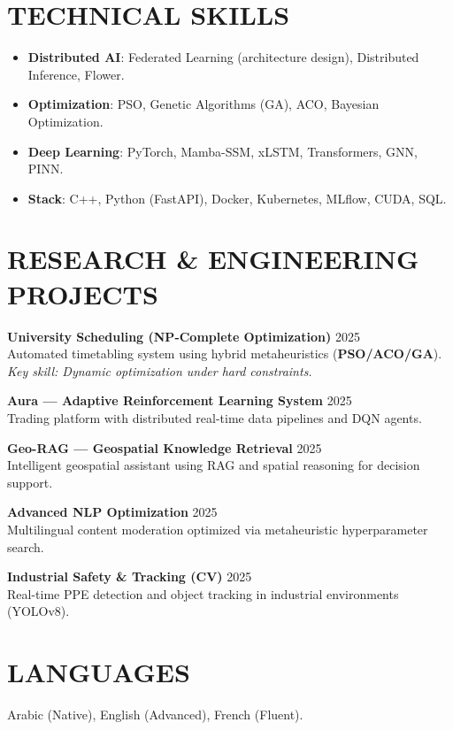 \documentclass[a4paper,11pt]{article}
\begin{document}
\section{TECHNICAL SKILLS}
\begin{itemize}
    \item \textbf{Distributed AI}: Federated Learning (architecture design), Distributed Inference, Flower.
    \item \textbf{Optimization}: PSO, Genetic Algorithms (GA), ACO, Bayesian Optimization.
    \item \textbf{Deep Learning}: PyTorch, Mamba-SSM, xLSTM, Transformers, GNN, PINN.
    \item \textbf{Stack}: C++, Python (FastAPI), Docker, Kubernetes, MLflow, CUDA, SQL.
\end{itemize}

\section{RESEARCH & ENGINEERING PROJECTS}

\textbf{University Scheduling (NP-Complete Optimization)} \hfill 2025 \\
Automated timetabling system using hybrid metaheuristics (\textbf{PSO/ACO/GA}).
\textit{Key skill: Dynamic optimization under hard constraints.}

\textbf{Aura — Adaptive Reinforcement Learning System} \hfill 2025 \\
Trading platform with distributed real-time data pipelines and DQN agents.

\textbf{Geo-RAG — Geospatial Knowledge Retrieval} \hfill 2025 \\
Intelligent geospatial assistant using RAG and spatial reasoning for decision support.

\textbf{Advanced NLP Optimization} \hfill 2025 \\
Multilingual content moderation optimized via metaheuristic hyperparameter search.

\textbf{Industrial Safety & Tracking (CV)} \hfill 2025 \\
Real-time PPE detection and object tracking in industrial environments (YOLOv8).

\section{LANGUAGES}
Arabic (Native), English (Advanced), French (Fluent).
\end{document}
